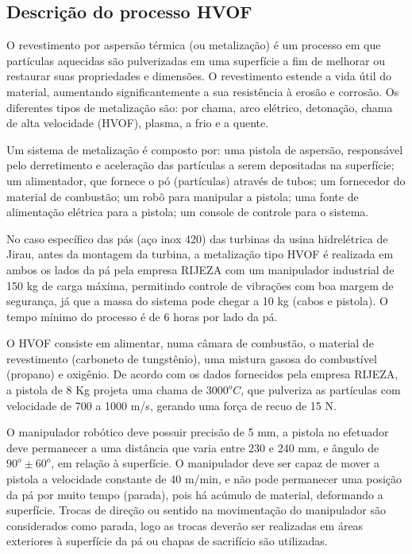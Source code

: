 \subsection{Descrição do processo HVOF}\label{sec::desc_hvof}
O revestimento por aspersão térmica (ou metalização) é um processo em que
partículas aquecidas são pulverizadas em uma superfície a fim de melhorar ou
restaurar suas propriedades e dimensões. O revestimento estende a vida útil do
material, aumentando significantemente a sua resistência à erosão e corrosão.
Os diferentes tipos de metalização são: por chama, arco elétrico, detonação,
chama de alta velocidade (HVOF), plasma, a frio e a quente.

Um sistema de metalização é composto por: uma pistola de aspersão, responsável
pelo derretimento e aceleração das partículas a serem depositadas na
superfície; um alimentador, que fornece o pó (partículas) através de tubos;
um fornecedor do material de combustão; um robô para manipular a pistola; uma
fonte de alimentação elétrica para a pistola; um console de controle para o
sistema.

No caso específico das pás (aço inox 420) das turbinas da usina hidrelétrica de
Jirau, antes da montagem da turbina, a metalização tipo HVOF é realizada em
ambos os lados da pá pela empresa RIJEZA com um manipulador industrial de 150 kg
de carga máxima, permitindo controle de vibrações com boa margem de segurança, já que a massa do
sistema pode chegar a 10 kg (cabos e pistola). O tempo
mínimo do processo é de 6 horas por lado da pá.

O HVOF consiste em alimentar, numa câmara de combustão, o material de
revestimento (carboneto de tungstênio), uma mistura gasosa do combustível (propano) e
oxigênio. De acordo com os dados fornecidos pela empresa RIJEZA, a pistola de 8
Kg projeta uma chama de $3000^oC$, que pulveriza as partículas com velocidade de
700 a 1000 m/s, gerando uma força de recuo de 15 N.

O manipulador robótico deve possuir precisão de 5 mm, a pistola no efetuador
deve permanecer a uma distância que varia entre 230 e 240 mm, e ângulo de $90^o
\pm 60^o$, em relação à superfície. O manipulador deve ser capaz de
mover a pistola a velocidade constante de 40 m/min, e não pode permanecer uma
posição da pá por muito tempo (parada), pois há acúmulo de material, deformando a
superfície. Trocas de direção ou sentido na movimentação do manipulador são
considerados como parada, logo as trocas deverão ser realizadas em áreas
exteriores à superfície da pá ou chapas de sacrifício são utilizadas. 

